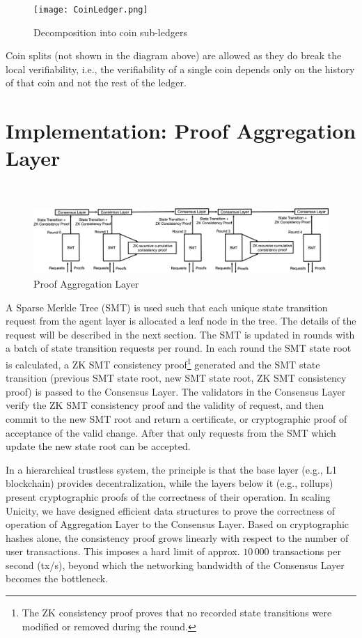 \documentclass{article}
\begin{document}
\begin{figure}[H]
    \centering
    \texttt{[image: CoinLedger.png]}
    \caption{Decomposition into coin sub-ledgers}
    \label{fig:coinledger}
\end{figure}


Coin splits (not shown in the diagram above) are allowed as they do break the local verifiability, i.e., the verifiability of a single coin depends only on the history of that coin and not the rest of the ledger.


\section{Implementation: Proof Aggregation Layer}

\


\begin{figure}[htbp]
    \centering
    \includegraphics[width=1\textwidth]{SMT-Infra2.png}
    \caption{Proof Aggregation Layer}
    \label{fig:SMT}
\end{figure}


 A Sparse Merkle Tree (SMT) is used such that each unique state transition request from the agent layer is allocated a leaf node in the tree. The details of the request will be described in the next section. The SMT is updated in rounds with a batch of state transition requests per round. In each round the SMT state root is calculated, a ZK SMT consistency proof\footnote{The ZK consistency proof proves that no recorded state transitions were modified or removed during the round.} generated and the SMT state transition (previous SMT state root, new SMT state root, ZK SMT consistency proof) is passed to the Consensus Layer. The validators in the Consensus Layer verify the ZK SMT consistency proof and the validity of request, and then commit to the new SMT root and return a certificate, or cryptographic proof of acceptance of the valid change. After that only requests from the SMT which update the new state root can be accepted.
 
 
 


In a hierarchical trustless system, the principle is that the base layer (e.g., L1 blockchain) provides decentralization, while the layers below it (e.g., rollups) present cryptographic proofs of the correctness of their operation. In scaling Unicity, we have designed efficient data structures to prove the correctness of operation of Aggregation Layer to the Consensus Layer. Based on cryptographic hashes alone, the consistency proof grows linearly with respect to the number of user transactions. This imposes a hard limit of approx. $10\,000$ transactions per second (tx/s), beyond which the networking bandwidth of the Consensus Layer becomes the bottleneck.
\end{document}
